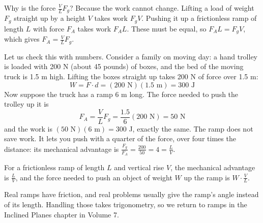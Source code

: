 \begin{center}
\end{center}

Why is the force $\frac{V}{L}F_g$? Because the work cannot change. Lifting a load
of weight $F_g$ straight up by a height $V$ takes work $F_g V$. Pushing it up a
frictionless ramp of length $L$ with force $F_A$ takes work $F_A L$. These must be
equal, so $F_A L = F_g V$, which gives $F_A = \frac{V}{L}F_g$.

Let us check this with numbers. Consider a family on moving day: a hand trolley is
loaded with 200 N (about 45 pounds) of boxes, and the bed of the moving truck is
1.5 m high. Lifting the boxes straight up takes 200 N of force over 1.5 m:
$$W = F \cdot d = \left( 200 \text{ N} \right) \left( 1.5 \text{ m} \right) = 300 \text{ J}$$
Now suppose the truck has a ramp 6 m long. The force needed to push the trolley up
it is
$$F_A = \frac{V}{L}F_g = \frac{1.5}{6}(200 \text{ N}) = 50 \text{ N}$$
and the work is $(50 \text{ N})(6 \text{ m}) = 300$ J, exactly the same. The ramp
does not save work. It lets you push with a quarter of the force, over four times
the distance: its mechanical advantage is $\frac{F_g}{F_A} = \frac{200}{50} = 4 = \frac{L}{V}$.

\begin{mdframed}[style = important, frametitle={Ramps}]
For a frictionless ramp of length $L$ and vertical rise $V$, the mechanical
advantage is $\frac{L}{V}$, and the force needed to push an object of weight $W$ up
the ramp is $W \cdot \frac{V}{L}$.
\end{mdframed}

Real ramps have friction, and real problems usually give the ramp's angle instead of
its length. Handling those takes trigonometry, so we return to ramps in the Inclined
Planes chapter in Volume 7.

